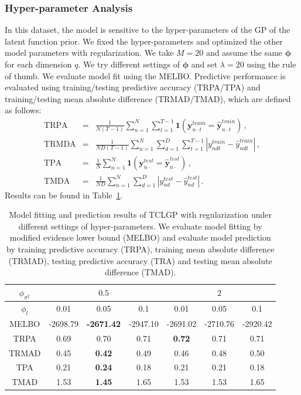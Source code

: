 \documentclass{article}
\begin{document}
\subsubsection{Hyper-parameter Analysis}
In this dataset, the model is sensitive to the hyper-parameters of the GP of the latent function prior. We fixed the hyper-parameters and optimized the other model parameters with regularization. We take $M = 20$ and assume the same $\bm \phi$ for each dimension $q$. We try different settings of $\bm \phi$ and set $\lambda =20$ using  the rule of thumb. We evaluate model fit using the MELBO. Predictive performance is evaluated using training/testing predictive accuracy (TRPA/TPA) and training/testing mean absolute difference (TRMAD/TMAD), which are defined as follows:
\begin{eqnarray}
\mathrm{TRPA} & = & \frac{1}{N(T-1)}\sum_{n = 1}^{N}\sum_{t = 1}^{T-1}\bm 1(\bm y^{train}_{n\cdot t} = \hat{\bm y}^{train}_{n\cdot t}) \,, \nonumber \\
\mathrm{TRMDA} & = & \frac{1}{ND(T-1)}\sum_{n = 1}^{N}\sum_{d = 1}^{D}\sum_{t=1}^{T-1}|y^{train}_{ndt}-\hat{y}^{train}_{ndt}| \,, \nonumber \\
\mathrm{TPA} & = & \frac{1}{N}\sum_{n = 1}^{N}\bm 1(\bm y^{test}_{n\cdot} = \hat{\bm y}^{test}_{n\cdot}) \,, \nonumber \\
\mathrm{TMDA} & = & \frac{1}{ND}\sum_{n = 1}^{N}\sum_{d = 1}^{D}|y^{test}_{nd}-\hat{y}^{test}_{nd}| \,. \nonumber
\end{eqnarray} 
%
Results can be found in Table~\ref{tab:STOCK}.

\begin{table}[ht!]
	\centering
	\begin{tabular}{|c|c|c|c|c|c|c|}
		\hline
		$\phi_{\sigma^2}$ & \multicolumn{3}{|c|}{$0.5$} & \multicolumn{3}{|c|}{$2$} \\
		\hline
		$\phi_l$ & 0.01 & 0.05 & 0.1 & 0.01 & 0.05 & 0.1  \\
		\hline
		MELBO & -2698.79 & \textbf{-2671.42} & -2947.10 & -2691.02 & -2710.76 & -2920.42\\
		\hline
		TRPA & 0.69 & 0.70 & 0.71 & \textbf{0.72} & 0.71 & 0.71  \\
		\hline
		TRMAD & 0.45 & \textbf{0.42} & 0.49 & 0.46 & 0.48 & 0.50 \\
		\hline
		TPA  & 0.21 & \textbf{0.24} & 0.18 & 0.21 & 0.21 & 0.18 \\
		\hline
		TMAD & 1.53 & \textbf{1.45} & 1.65 & 1.53 & 1.53 & 1.65 \\
		\hline
	\end{tabular}
    \caption{Model fitting and prediction results of TCLGP with regularization under different settings of hyper-parameters. We evaluate model fitting by modified evidence lower bound (MELBO) and evaluate model prediction by training predictive accuracy (TRPA), training mean absolute difference (TRMAD), testing predictive accuracy (TRA) and testing mean absolute difference (TMAD).}
	\label{tab:STOCK}
\end{table}
\end{document}
